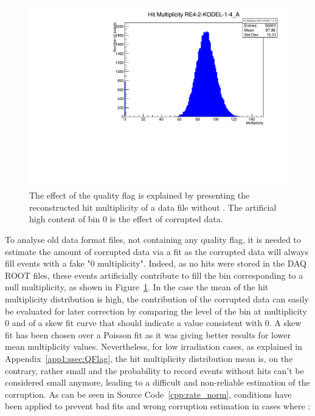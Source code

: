 	\begin{figure}[H]
        \centering
		\includegraphics[width = 0.7\linewidth]{fig/app1/No_Qflag_nhits_KODEL.pdf}
		\caption{\label{fig:corrupted} The effect of the quality flag is explained by presenting the reconstructed hit multiplicity of a data file without . The artificial high content of bin 0 is the effect of corrupted data.}
	\end{figure}
	
	To analyse old data format files, not containing any quality flag, it is needed to estimate the amount of corrupted data via a fit as the corrupted data will always fill events with a fake "0 multiplicity". Indeed, as no hits were stored in the DAQ ROOT files, these events artificially contribute to fill the bin corresponding to a null multiplicity, as shown in Figure~\ref{fig:corrupted}. In the case the mean of the hit multiplicity distribution is high, the contribution of the corrupted data can easily be evaluated for later correction by comparing the level of the bin at multiplicity 0 and of a skew fit curve that should indicate a value consistent with 0. A skew fit has been chosen over a Poisson fit as it was giving better results for lower mean multiplicity  values. Nevertheless, for low irradiation cases, as explained in Appendix~\ref{app1:ssec:QFlag}, the hit multiplicity distribution mean is, on the contrary, rather small and the probability to record events without hits can't be considered small anymore, leading to a difficult and non-reliable estimation of the corruption. As can be seen in Source Code~\ref{cpp:rate_norm}, conditions have been applied to prevent bad fits and wrong corruption estimation in cases where :

